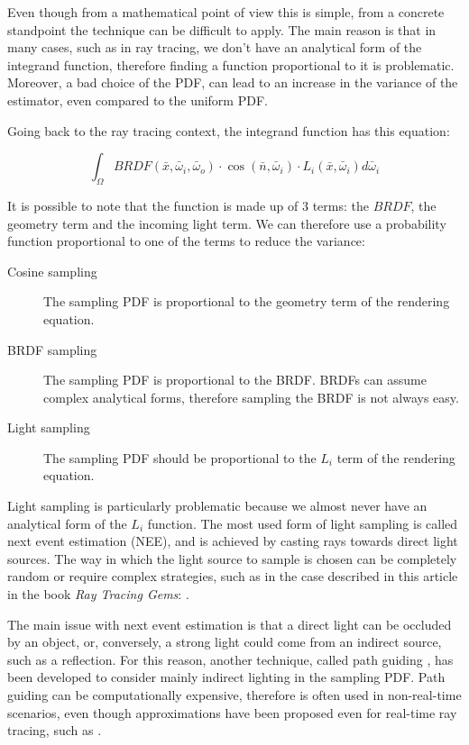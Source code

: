 \documentclass{PoliMi_MasterThesis}
\begin{document}
Even though from a mathematical point of view this is simple, from a concrete standpoint the technique can be difficult to apply. The main reason is that in many cases, such as in ray tracing, we don't have an analytical form of the integrand function, therefore finding a function proportional to it is problematic. Moreover, a bad choice of the PDF, can lead to an increase in the variance of the estimator, even compared to the uniform PDF.

Going back to the ray tracing context, the integrand function has this equation:

$$\int_\Omega BRDF(\bar{x}, \bar{\omega}_i, \bar{\omega}_o) \cdot \cos(\bar{n}, \bar{\omega}_i) \cdot L_i(\bar{x}, \bar{\omega}_i) d\bar{\omega}_i$$

It is possible to note that the function is made up of 3 terms: the $BRDF$, the geometry term and the incoming light term. We can therefore use a probability function proportional to one of the terms to reduce the variance:
\begin{description}
	\item[Cosine sampling] The sampling PDF is proportional to the geometry term of the rendering equation.
	\item[BRDF sampling] The sampling PDF is proportional to the BRDF. BRDFs can assume complex analytical forms, therefore sampling the BRDF is not always easy.
	\item[Light sampling] The sampling PDF should be proportional to the $L_i$ term of the rendering equation.
\end{description}

Light sampling is particularly problematic because we almost never have an analytical form of the $L_i$ function. The most used form of light sampling is called next event estimation (NEE), and is achieved by casting rays towards direct light sources. The way in which the light source to sample is chosen can be completely random or require complex strategies, such as in the case described in this article in the book \textit{Ray Tracing Gems}: \cite{multi_light_sampling}.

The main issue with next event estimation is that a direct light can be occluded by an object, or, conversely, a strong light could come from an indirect source, such as a reflection. For this reason, another technique, called path guiding \cite{path_guiding}, has been developed to consider mainly indirect lighting in the sampling PDF. Path guiding can be computationally expensive, therefore is often used in non-real-time scenarios, even though approximations have been proposed even for real-time ray tracing, such as \cite{real_time_path_guiding}.
\end{document}

